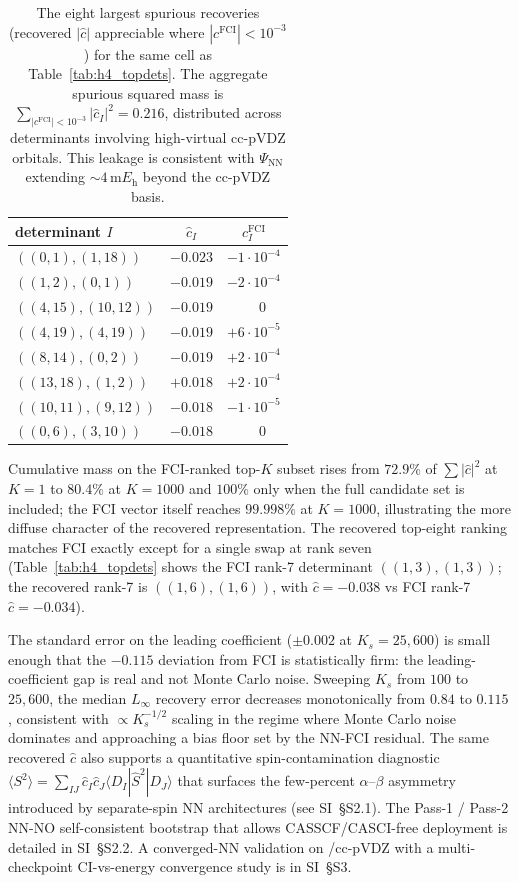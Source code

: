 \documentclass[journal=jctcce,manuscript=article,layout=traditional]{achemso}
\begin{document}
\begin{table}[t]
\caption{The eight largest spurious recoveries (recovered $|\widehat{c}|$
appreciable where $|c^{\mathrm{FCI}}| < 10^{-3}$) for the same cell as
Table~\ref{tab:h4_topdets}. The aggregate spurious squared mass is
$\sum_{|c^{\mathrm{FCI}}| < 10^{-3}} |\widehat{c}_I|^2 = 0.216$,
distributed across determinants involving high-virtual cc-pVDZ orbitals.
This leakage is consistent with $\Psi_{\mathrm{NN}}$ extending
$\sim 4\,\mathrm{m}E_{\mathrm{h}}$ beyond the cc-pVDZ basis.}
\label{tab:h4_spurious}
\centering
\begin{tabular}{lcc}
\toprule
determinant $I$ & $\widehat{c}_I$ & $c^{\mathrm{FCI}}_I$ \\
\midrule
$((0,1),(1,18))$    & $-0.023$ & $-1\!\cdot\!10^{-4}$ \\
$((1,2),(0,1))$     & $-0.019$ & $-2\!\cdot\!10^{-4}$ \\
$((4,15),(10,12))$  & $-0.019$ & $\phantom{+}0$ \\
$((4,19),(4,19))$   & $-0.019$ & $+6\!\cdot\!10^{-5}$ \\
$((8,14),(0,2))$    & $-0.019$ & $+2\!\cdot\!10^{-4}$ \\
$((13,18),(1,2))$   & $+0.018$ & $+2\!\cdot\!10^{-4}$ \\
$((10,11),(9,12))$  & $-0.018$ & $-1\!\cdot\!10^{-5}$ \\
$((0,6),(3,10))$    & $-0.018$ & $\phantom{+}0$ \\
\bottomrule
\end{tabular}
\end{table}

Cumulative mass on the FCI-ranked top-$K$ subset rises from $72.9\%$
of $\sum |\widehat{c}|^2$ at $K = 1$ to $80.4\%$ at $K = 1000$ and
$100\%$ only when the full candidate set is included; the FCI vector
itself reaches $99.998\%$ at $K = 1000$, illustrating the more diffuse
character of the recovered representation. The recovered top-eight
ranking matches FCI exactly except for a single swap at rank seven
(Table~\ref{tab:h4_topdets} shows the FCI rank-7 determinant
$((1,3),(1,3))$; the recovered rank-7 is $((1,6),(1,6))$, with
$\widehat{c} = -0.038$ vs FCI rank-7 $\widehat{c} = -0.034$).

The standard error on the leading coefficient ($\pm 0.002$ at
$K_s = 25{,}600$) is small enough that the $-0.115$ deviation from FCI
is statistically firm: the leading-coefficient gap is real and not
Monte Carlo noise. Sweeping $K_s$ from $100$ to $25{,}600$, the
median $L_{\infty}$ recovery error decreases monotonically from
$0.84$ to $0.115$, consistent with $\propto K_s^{-1/2}$ scaling in
the regime where Monte Carlo noise dominates and approaching a bias
floor set by the NN-FCI residual. The same recovered $\widehat c$
also supports a quantitative spin-contamination diagnostic
$\langle S^2\rangle = \sum_{IJ} \widehat c_I \widehat c_J
\langle D_I|\hat S^2|D_J\rangle$ that surfaces the few-percent
$\alpha$--$\beta$ asymmetry introduced by separate-spin NN
architectures (see SI~\S S2.1). The Pass-1
/ Pass-2 NN-NO self-consistent bootstrap that allows
CASSCF/CASCI-free deployment is detailed in
SI~\S S2.2. A converged-NN validation on
/cc-pVDZ with a multi-checkpoint CI-vs-energy convergence
study is in SI~\S S3.
\end{document}
